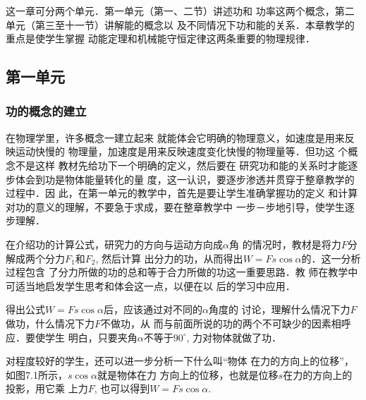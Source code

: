 这一章可分两个单元．第一单元（第一、二节）讲述功和
功率这两个概念，第二单元（第三至十一节）讲解能的概念以
及不同情况下功和能的关系．本章教学的重点是使学生掌握
动能定理和机械能守恒定律这两条重要的物理规律．

\subsection{第一单元}
\subsubsection{功的概念的建立}

在物理学里，许多概念一建立起来
就能体会它明确的物理意义，如速度是用来反映运动快慢的
物理量，加速度是用来反映速度变化快慢的物理量等．但功这
个概念不是这样 教材先给功下一个明确的定义，然后要在
研究功和能的关系时才能逐步体会到功是物体能量转化的量
度，这一认识，要逐步渗透并贯穿于整章教学的过程中．因
此，在第一单元的教学中，首先是要让学生准确掌握功的定义
和计算 对功的意义的理解，不要急于求成，要在整章教学中
一步－步地引导，使学生逐步理解．

在介绍功的计算公式，研究力的方向与运动方向成$\alpha$角
的情况时，教材是将力$F$分解成两个分力$F_1$和$F_2$, 然后计算
出分力的功，从而得出$W=Fs\cos\alpha$的．这一分析过程包含
了分力所做的功的总和等于合力所做的功这一重要思路．教
师在教学中可适当地启发学生思考和体会这一点，以便在以
后的学习中应用．

得出公式$W=Fs\cos\alpha$后，应该通过对不同的$\alpha$角度的
讨论，理解什么情况下力$F$做功，什么情况下力$F$不做功，从
而与前面所说的功的两个不可缺少的因素相呼应．要使学生
明白，只要夹角$\alpha$不等于$90^{\circ}$, 力对物体就做了功．

对程度较好的学生，还可以进一步分析一下什么叫“物体
在力的方向上的位移”，如图7.1所示，$s\cos\alpha$就是物体在力
方向上的位移，也就是位移$s$在力的方向上的投影，用它乘
上力$F$, 也可以得到$W=Fs\cos\alpha$.
\begin{figure}[htp]
    \centering
{}
    \caption{}
\end{figure}

